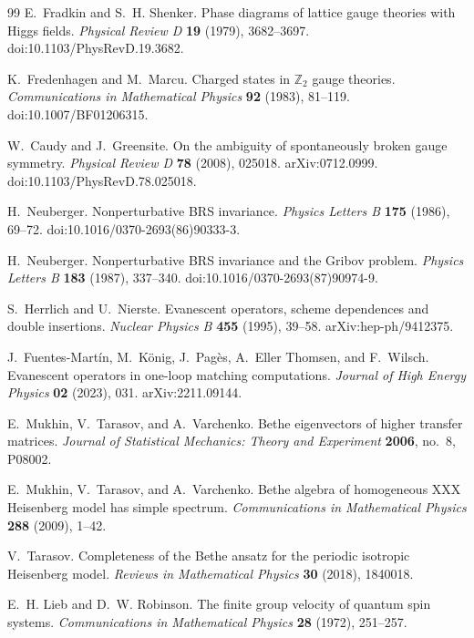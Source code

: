 \begin{thebibliography}{99}
E.~Fradkin and S.~H. Shenker.
Phase diagrams of lattice gauge theories with Higgs fields.
\emph{Physical Review D} \textbf{19} (1979), 3682--3697.
doi:10.1103/PhysRevD.19.3682.

K.~Fredenhagen and M.~Marcu.
Charged states in \(\mathbb Z_2\) gauge theories.
\emph{Communications in Mathematical Physics} \textbf{92} (1983), 81--119.
doi:10.1007/BF01206315.

W.~Caudy and J.~Greensite.
On the ambiguity of spontaneously broken gauge symmetry.
\emph{Physical Review D} \textbf{78} (2008), 025018.
arXiv:0712.0999.
doi:10.1103/PhysRevD.78.025018.

H.~Neuberger.
Nonperturbative BRS invariance.
\emph{Physics Letters B} \textbf{175} (1986), 69--72.
doi:10.1016/0370-2693(86)90333-3.

H.~Neuberger.
Nonperturbative BRS invariance and the Gribov problem.
\emph{Physics Letters B} \textbf{183} (1987), 337--340.
doi:10.1016/0370-2693(87)90974-9.

S.~Herrlich and U.~Nierste.
Evanescent operators, scheme dependences and double insertions.
\emph{Nuclear Physics B} \textbf{455} (1995), 39--58.
arXiv:hep-ph/9412375.

J.~Fuentes-Mart\'in, M.~K\"onig, J.~Pag\`es, A.~Eller Thomsen, and
F.~Wilsch.
Evanescent operators in one-loop matching computations.
\emph{Journal of High Energy Physics} \textbf{02} (2023), 031.
arXiv:2211.09144.

E.~Mukhin, V.~Tarasov, and A.~Varchenko.
Bethe eigenvectors of higher transfer matrices.
\emph{Journal of Statistical Mechanics: Theory and Experiment} \textbf{2006},
no.~8, P08002.

E.~Mukhin, V.~Tarasov, and A.~Varchenko.
Bethe algebra of homogeneous XXX Heisenberg model has simple spectrum.
\emph{Communications in Mathematical Physics} \textbf{288} (2009), 1--42.

V.~Tarasov.
Completeness of the Bethe ansatz for the periodic isotropic Heisenberg model.
\emph{Reviews in Mathematical Physics} \textbf{30} (2018), 1840018.

E.~H. Lieb and D.~W. Robinson.
The finite group velocity of quantum spin systems.
\emph{Communications in Mathematical Physics} \textbf{28} (1972), 251--257.


\end{thebibliography}

